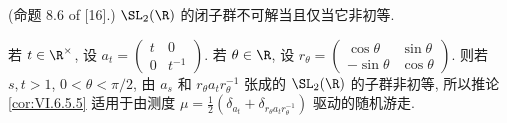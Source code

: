 \begin{proposition}[非初等与不可解]
\label{prop:VI.6.5.6}
(命题 8.6 of {[}16{]}.)
$\SL_2(\R)$ 的闭子群不可解当且仅当它非初等.
\end{proposition}

\begin{example}[非初等子群的随机游走]
\label{exa:VI.6.5.7}
若 $t \in \R^{\times}$, 设 $a_t = \begin{pmatrix} t & 0 \\ 0 & t^{-1} \end{pmatrix}$. 若 $\theta \in \R$, 设 $r_{\theta} = \begin{pmatrix} \cos\theta & \sin\theta \\ -\sin\theta & \cos\theta \end{pmatrix}$.
则若 $s, t > 1$, $0 < \theta < \pi/2$, 由 $a_s$ 和 $r_{\theta}a_tr_{\theta}^{-1}$ 张成的 $\SL_2(\R)$ 的子群非初等, 所以推论 \ref{cor:VI.6.5.5} 适用于由测度 $\mu = \frac{1}{2}(\delta_{a_t} + \delta_{r_{\theta}a_tr_{\theta}^{-1}})$ 驱动的随机游走.
\end{example}

